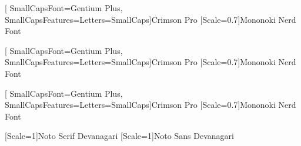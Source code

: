 
[
	SmallCapsFont=Gentium Plus,
	SmallCapsFeatures={Letters=SmallCaps}]{Crimson Pro}
[Scale=0.7]{Mononoki Nerd Font}

[
	SmallCapsFont=Gentium Plus,
	SmallCapsFeatures={Letters=SmallCaps}]{Crimson Pro}
[Scale=0.7]{Mononoki Nerd Font}

[
	SmallCapsFont=Gentium Plus,
	SmallCapsFeatures={Letters=SmallCaps}]{Crimson Pro}
[Scale=0.7]{Mononoki Nerd Font}





[Scale=1]{Noto Serif Devanagari}
[Scale=1]{Noto Sans Devanagari}
